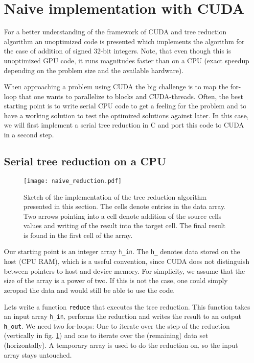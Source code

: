 \section{Naive implementation with CUDA}
For a better understanding of the framework of CUDA and tree reduction algorithm an unoptimized code is presented which implements the algorithm for the case of addition of signed 32-bit integers. 
Note, that even though this is unoptimized GPU code, it runs magnitudes faster than on a CPU (exact speedup depending on the problem size and the available hardware).

When approaching a problem using CUDA the big challenge is to map the for-loop that one wants to parallelize to blocks and CUDA-threads. 
Often, the best starting point is to write serial CPU code to get a feeling for the problem and to have a working solution to test the optimized solutions against later.
In this case, we will first implement a serial tree reduction in C and port this code to CUDA in a second step.

\subsection{Serial tree reduction on a CPU}
\begin{figure} \label{fig_naive_reduction}
    \centering
    \texttt{[image: naive\_reduction.pdf]}
    \caption{
        Sketch of the implementation of the tree reduction algorithm presented in this section.
        The cells denote entries in the data array.
        Two arrows pointing into a cell denote addition of the source cells values and writing of the result into the target cell.
        The final result is found in the first cell of the array.
    }
\end{figure}
Our starting point is an integer array \texttt{h\_in}.
The \texttt{h\_} denotes data stored on the host (CPU RAM), which is a useful convention, since CUDA does not distinguish between pointers to host and device memory.
For simplicity, we assume that the size of the array is a power of two.
If this is not the case, one could simply zeropad the data and would still be able to use the code.

Lets write a function \texttt{reduce} that executes the tree reduction.
This function takes an input array \texttt{h\_in}, performs the reduction and writes the result to an output \texttt{h\_out}. 
We need two for-loops:
One to iterate over the step of the reduction (vertically in fig. \ref{fig_naive_reduction}) and one to iterate over the (remaining) data set (horizontally). 
A temporary array is used to do the reduction on, so the input array stays untouched.

